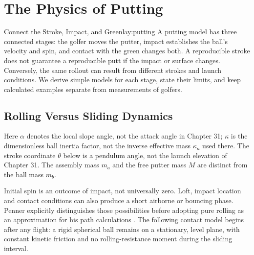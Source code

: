 \chapter{The Physics of Putting}
\label{ch:putting}

\begin{laymansbox}{Connect the Stroke, Impact, and Green}{lay:putting}
A putting model has three connected stages: the golfer moves the putter, impact establishes the ball's velocity and spin, and contact with the green changes both. A reproducible stroke does not guarantee a reproducible putt if the impact or surface changes. Conversely, the same rollout can result from different strokes and launch conditions. We derive simple models for each stage, state their limits, and keep calculated examples separate from measurements of golfers.
\end{laymansbox}

\section{Rolling Versus Sliding Dynamics}
\label{sec:putting_roll_slide}

Here $\alpha$ denotes the local slope angle, not the attack angle in Chapter 31; $\kappa$ is the dimensionless ball inertia factor, not the inverse effective mass $\kappa_n$ used there. The stroke coordinate $\theta$ below is a pendulum angle, not the launch elevation of Chapter 31. The assembly mass $m_a$ and the free putter mass $M$ are distinct from the ball mass $m_b$.

Initial spin is an outcome of impact, not universally zero. Loft, impact location and contact conditions can also produce a short airborne or bouncing phase. Penner explicitly distinguishes those possibilities before adopting pure rolling as an approximation for his path calculations \cite{penner2002putting}. The following contact model begins after any flight: a rigid spherical ball remains on a stationary, level plane, with constant kinetic friction and no rolling-resistance moment during the sliding interval.

